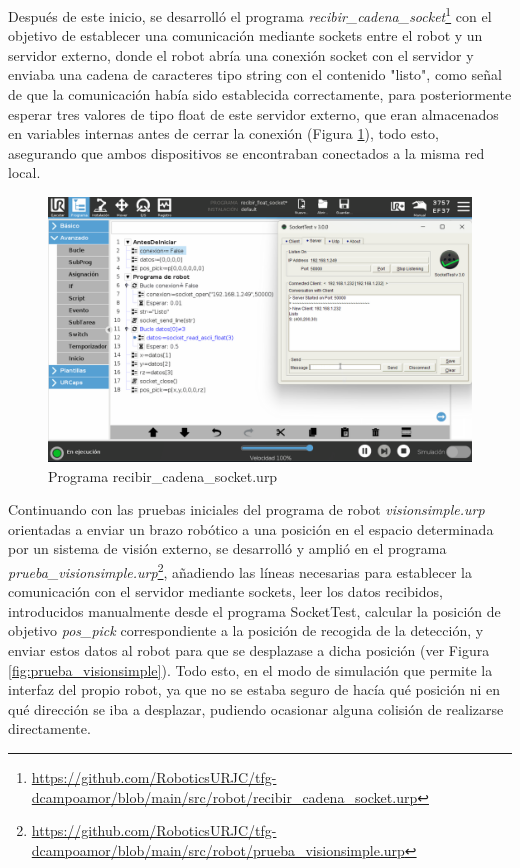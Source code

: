 Después de este inicio, se desarrolló el programa \textit{recibir\_cadena\_socket}\footnote{\url{https://github.com/RoboticsURJC/tfg-dcampoamor/blob/main/src/robot/recibir_cadena_socket.urp}} con el objetivo de establecer una comunicación mediante sockets entre el robot y un servidor externo, donde el robot abría una conexión socket con el servidor y enviaba una cadena de caracteres tipo string con el contenido "listo", como señal de que la comunicación había sido establecida correctamente, para posteriormente esperar tres valores de tipo float de este servidor externo, que eran almacenados en variables internas antes de cerrar la conexión (Figura \ref{fig:recibir_cadena_socket}), todo esto, asegurando que ambos dispositivos se encontraban conectados a la misma red local.

   \begin{figure}[H]
     \centering
     \begin{center}
       \includegraphics[width=130mm]{figs/recibir_cadena_socket.png}
     \end{center}
     \caption{Programa recibir\_cadena\_socket.urp}
     \label{fig:recibir_cadena_socket}
  \end{figure}

Continuando con las pruebas iniciales del programa de robot \textit{visionsimple.urp} orientadas a enviar un brazo robótico a una posición en el espacio determinada por un sistema de visión externo, se desarrolló y amplió en el programa \textit{prueba\_visionsimple.urp}\footnote{\url{https://github.com/RoboticsURJC/tfg-dcampoamor/blob/main/src/robot/prueba_visionsimple.urp}}, añadiendo las líneas necesarias para establecer la comunicación con el servidor mediante sockets, leer los datos recibidos, introducidos manualmente desde el programa SocketTest, calcular la posición de objetivo \textit{pos\_pick} correspondiente a la posición de recogida de la detección, y enviar estos datos al robot para que se desplazase a dicha posición (ver Figura \ref{fig:prueba_visionsimple}). Todo esto, en el modo de simulación que permite la interfaz del propio robot, ya que no se estaba seguro de hacía qué posición ni en qué dirección se iba a desplazar, pudiendo ocasionar alguna colisión de realizarse directamente. 


